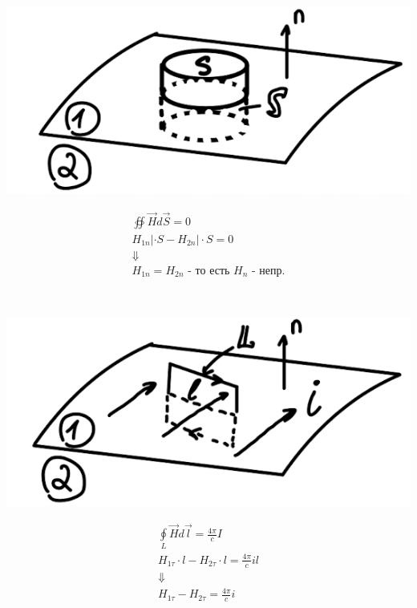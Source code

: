 \begin{minipage}[c]{0.5\textwidth} %
    \includegraphics[width=\textwidth]{im/67.png} %
\end{minipage}%
\hfill
\begin{minipage}[c]{0.55\textwidth} %
    \begin{gather*}
        \oiint \vec{H}d\vec{S}=0 \\
        H_{1n}|\cdot S-H_{2n}|\cdot S=0 \\
        \Downarrow \\
        \boxed{H_{1n}=H_{2n}} \text{ - то есть } H_n \text{ - непр.}
    \end{gather*}
\end{minipage}
\( \text{ } \)  
\begin{minipage}[c]{0.5\textwidth} %
    \includegraphics[width=\textwidth]{im/68.png} %
\end{minipage}%
\hfill
\begin{minipage}[c]{0.55\textwidth} %
    \begin{gather*}
        \underset{L}{\oint}\vec{H}d\vec{l}=\frac{4\pi}{c}I \\
        H_{1\tau}\cdot l - H_{2\tau}\cdot l =\frac{4\pi}{c}il \\
        \Downarrow \\
        \boxed{H_{1\tau}- H_{2\tau} = \frac{4\pi}{c}i }
    \end{gather*}
\end{minipage}


